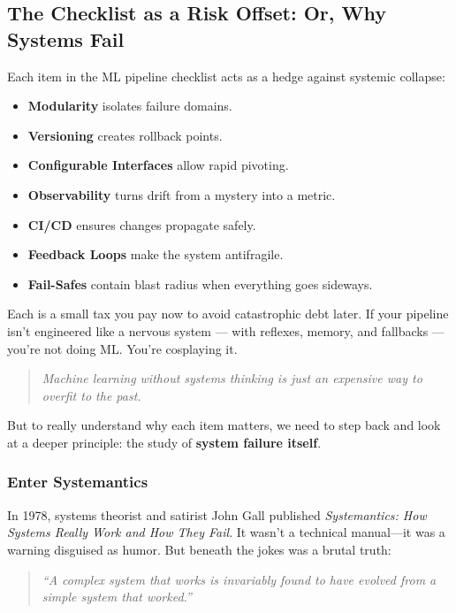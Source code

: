 \medskip

\subsection{The Checklist as a Risk Offset: Or, Why Systems Fail}

Each item in the ML pipeline checklist acts as a hedge against systemic collapse:

\begin{itemize}
    \item \textbf{Modularity} isolates failure domains.
    \item \textbf{Versioning} creates rollback points.
    \item \textbf{Configurable Interfaces} allow rapid pivoting.
    \item \textbf{Observability} turns drift from a mystery into a metric.
    \item \textbf{CI/CD} ensures changes propagate safely.
    \item \textbf{Feedback Loops} make the system antifragile.
    \item \textbf{Fail-Safes} contain blast radius when everything goes sideways.
\end{itemize}

Each is a small tax you pay now to avoid catastrophic debt later. If your pipeline isn’t engineered like a nervous system — with reflexes, memory, and fallbacks — you’re not doing ML. You’re cosplaying it.

\medskip

\begin{quote}
\textit{Machine learning without systems thinking is just an expensive way to overfit to the past.}
\end{quote}

\medskip

But to really understand why each item matters, we need to step back and look at a deeper principle:  
the study of \textbf{system failure itself}.

\subsubsection*{Enter Systemantics}

In 1978, systems theorist and satirist John Gall published \textit{Systemantics: How Systems Really Work and How They Fail}.  
It wasn’t a technical manual—it was a warning disguised as humor. But beneath the jokes was a brutal truth:  
\begin{quote}
\textit{“A complex system that works is invariably found to have evolved from a simple system that worked.”}
\end{quote}

